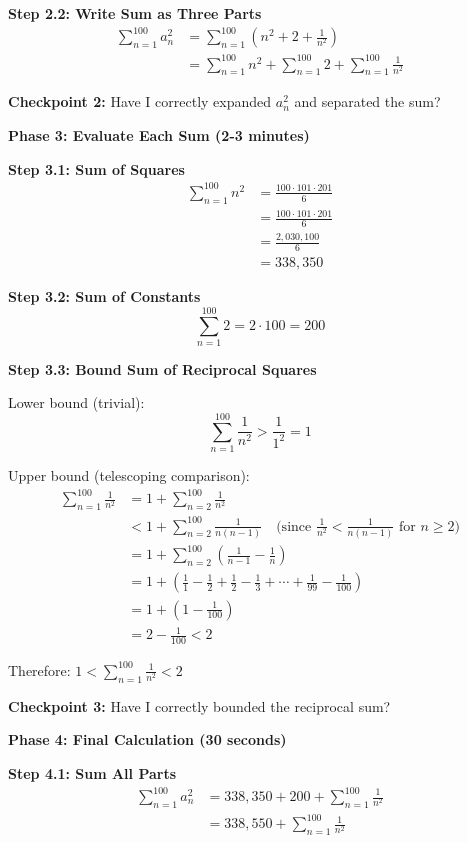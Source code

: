 \documentclass[12pt]{article}
\begin{document}
\begin{solutionbox}
\textbf{Step 2.2: Write Sum as Three Parts}
\begin{align*}
\sum_{n=1}^{100} a_n^2 &= \sum_{n=1}^{100} \left(n^2 + 2 + \frac{1}{n^2}\right) \\
&= \sum_{n=1}^{100} n^2 + \sum_{n=1}^{100} 2 + \sum_{n=1}^{100} \frac{1}{n^2}
\end{align*}

\textbf{Checkpoint 2:} Have I correctly expanded $a_n^2$ and separated the sum?

\textbf{Phase 3: Evaluate Each Sum (2-3 minutes)}

\textbf{Step 3.1: Sum of Squares}
\begin{align*}
\sum_{n=1}^{100} n^2 &= \frac{100 \cdot 101 \cdot 201}{6} \\
&= \frac{100 \cdot 101 \cdot 201}{6} \\
&= \frac{2{,}030{,}100}{6} \\
&= 338{,}350
\end{align*}

\textbf{Step 3.2: Sum of Constants}
\[\sum_{n=1}^{100} 2 = 2 \cdot 100 = 200\]

\textbf{Step 3.3: Bound Sum of Reciprocal Squares}

Lower bound (trivial):
\[\sum_{n=1}^{100} \frac{1}{n^2} > \frac{1}{1^2} = 1\]

Upper bound (telescoping comparison):
\begin{align*}
\sum_{n=1}^{100} \frac{1}{n^2} &= 1 + \sum_{n=2}^{100} \frac{1}{n^2} \\
&< 1 + \sum_{n=2}^{100} \frac{1}{n(n-1)} \quad \text{(since } \frac{1}{n^2} < \frac{1}{n(n-1)} \text{ for } n \geq 2\text{)} \\
&= 1 + \sum_{n=2}^{100} \left(\frac{1}{n-1} - \frac{1}{n}\right) \\
&= 1 + \left(\frac{1}{1} - \frac{1}{2} + \frac{1}{2} - \frac{1}{3} + \cdots + \frac{1}{99} - \frac{1}{100}\right) \\
&= 1 + \left(1 - \frac{1}{100}\right) \\
&= 2 - \frac{1}{100} < 2
\end{align*}

Therefore: $1 < \sum_{n=1}^{100} \frac{1}{n^2} < 2$

\textbf{Checkpoint 3:} Have I correctly bounded the reciprocal sum?

\textbf{Phase 4: Final Calculation (30 seconds)}

\textbf{Step 4.1: Sum All Parts}
\begin{align*}
\sum_{n=1}^{100} a_n^2 &= 338{,}350 + 200 + \sum_{n=1}^{100} \frac{1}{n^2} \\
&= 338{,}550 + \sum_{n=1}^{100} \frac{1}{n^2}
\end{align*}


\end{solutionbox}
\end{document}
